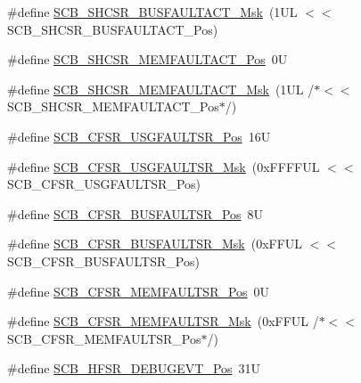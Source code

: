 \begin{DoxyCompactItemize}
\item 
\#define \mbox{\hyperlink{group___c_m_s_i_s___s_c_b_ga9d7a8b1054b655ad08d85c3c535d4f73}{S\+C\+B\+\_\+\+S\+H\+C\+S\+R\+\_\+\+B\+U\+S\+F\+A\+U\+L\+T\+A\+C\+T\+\_\+\+Msk}}~(1\+U\+L $<$$<$ S\+C\+B\+\_\+\+S\+H\+C\+S\+R\+\_\+\+B\+U\+S\+F\+A\+U\+L\+T\+A\+C\+T\+\_\+\+Pos)
\item 
\#define \mbox{\hyperlink{group___c_m_s_i_s___s_c_b_ga7c856f79a75dcc1d1517b19a67691803}{S\+C\+B\+\_\+\+S\+H\+C\+S\+R\+\_\+\+M\+E\+M\+F\+A\+U\+L\+T\+A\+C\+T\+\_\+\+Pos}}~0U
\item 
\#define \mbox{\hyperlink{group___c_m_s_i_s___s_c_b_ga9147fd4e1b12394ae26eadf900a023a3}{S\+C\+B\+\_\+\+S\+H\+C\+S\+R\+\_\+\+M\+E\+M\+F\+A\+U\+L\+T\+A\+C\+T\+\_\+\+Msk}}~(1\+U\+L /$\ast$$<$$<$ S\+C\+B\+\_\+\+S\+H\+C\+S\+R\+\_\+\+M\+E\+M\+F\+A\+U\+L\+T\+A\+C\+T\+\_\+\+Pos$\ast$/)
\item 
\#define \mbox{\hyperlink{group___c_m_s_i_s___s_c_b_gac8e4197b295c8560e68e2d71285c7879}{S\+C\+B\+\_\+\+C\+F\+S\+R\+\_\+\+U\+S\+G\+F\+A\+U\+L\+T\+S\+R\+\_\+\+Pos}}~16U
\item 
\#define \mbox{\hyperlink{group___c_m_s_i_s___s_c_b_ga565807b1a3f31891f1f967d0fa30d03f}{S\+C\+B\+\_\+\+C\+F\+S\+R\+\_\+\+U\+S\+G\+F\+A\+U\+L\+T\+S\+R\+\_\+\+Msk}}~(0x\+F\+F\+F\+F\+U\+L $<$$<$ S\+C\+B\+\_\+\+C\+F\+S\+R\+\_\+\+U\+S\+G\+F\+A\+U\+L\+T\+S\+R\+\_\+\+Pos)
\item 
\#define \mbox{\hyperlink{group___c_m_s_i_s___s_c_b_ga555a24f4f57d199f91d1d1ab7c8c3c8a}{S\+C\+B\+\_\+\+C\+F\+S\+R\+\_\+\+B\+U\+S\+F\+A\+U\+L\+T\+S\+R\+\_\+\+Pos}}~8U
\item 
\#define \mbox{\hyperlink{group___c_m_s_i_s___s_c_b_ga26dc1ddfdc37a6b92597a6f7e498c1d6}{S\+C\+B\+\_\+\+C\+F\+S\+R\+\_\+\+B\+U\+S\+F\+A\+U\+L\+T\+S\+R\+\_\+\+Msk}}~(0x\+F\+F\+U\+L $<$$<$ S\+C\+B\+\_\+\+C\+F\+S\+R\+\_\+\+B\+U\+S\+F\+A\+U\+L\+T\+S\+R\+\_\+\+Pos)
\item 
\#define \mbox{\hyperlink{group___c_m_s_i_s___s_c_b_ga91f41491cec5b5acca3fbc94efbd799e}{S\+C\+B\+\_\+\+C\+F\+S\+R\+\_\+\+M\+E\+M\+F\+A\+U\+L\+T\+S\+R\+\_\+\+Pos}}~0U
\item 
\#define \mbox{\hyperlink{group___c_m_s_i_s___s_c_b_gad46716159a3808c9e7da22067d6bec98}{S\+C\+B\+\_\+\+C\+F\+S\+R\+\_\+\+M\+E\+M\+F\+A\+U\+L\+T\+S\+R\+\_\+\+Msk}}~(0x\+F\+F\+U\+L /$\ast$$<$$<$ S\+C\+B\+\_\+\+C\+F\+S\+R\+\_\+\+M\+E\+M\+F\+A\+U\+L\+T\+S\+R\+\_\+\+Pos$\ast$/)
\item 
\#define \mbox{\hyperlink{group___c_m_s_i_s___s_c_b_ga300c90cfb7b35c82b4d44ad16c757ffb}{S\+C\+B\+\_\+\+H\+F\+S\+R\+\_\+\+D\+E\+B\+U\+G\+E\+V\+T\+\_\+\+Pos}}~31U
$$
\end{DoxyCompactItemize}
